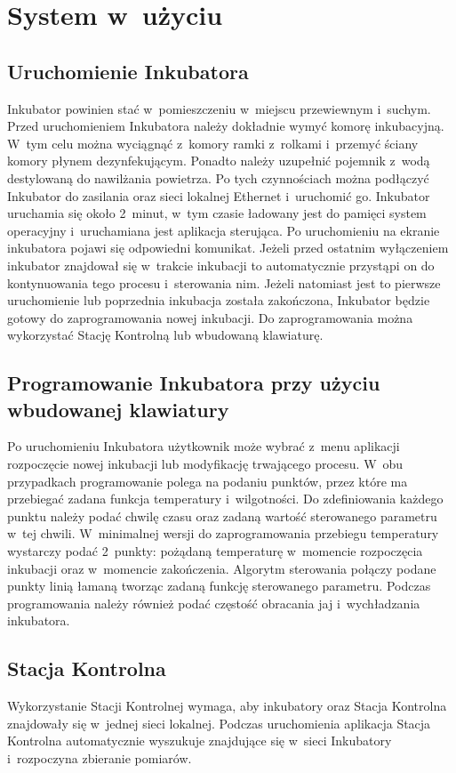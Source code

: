 
\chapter{System w~użyciu}
\label{sec:Praktyka}

\section{Uruchomienie Inkubatora}
Inkubator powinien stać w~pomieszczeniu w~miejscu przewiewnym i~suchym. Przed
uruchomieniem Inkubatora należy dokładnie wymyć komorę inkubacyjną. W~tym celu
można wyciągnąć z~komory ramki z~rolkami i~przemyć ściany komory płynem
dezynfekującym. Ponadto należy uzupełnić pojemnik z~wodą destylowaną do
nawilżania powietrza. Po tych czynnościach można podłączyć Inkubator do
zasilania oraz sieci lokalnej Ethernet i~uruchomić go. Inkubator uruchamia się
około 2~minut, w~tym czasie ładowany jest do pamięci system operacyjny
i~uruchamiana jest aplikacja sterująca. Po uruchomieniu na ekranie
inkubatora pojawi się odpowiedni komunikat. Jeżeli przed ostatnim wyłączeniem
inkubator znajdował się w~trakcie inkubacji to automatycznie przystąpi on do
kontynuowania tego procesu i~sterowania nim. Jeżeli natomiast jest to pierwsze
uruchomienie lub poprzednia inkubacja została zakończona, Inkubator będzie
gotowy do zaprogramowania nowej inkubacji. Do zaprogramowania można wykorzystać
Stację Kontrolną lub wbudowaną klawiaturę.

\section{Programowanie Inkubatora przy użyciu wbudowanej klawiatury}
Po uruchomieniu Inkubatora użytkownik może wybrać z~menu aplikacji rozpoczęcie
nowej inkubacji lub modyfikację trwającego procesu. W~obu przypadkach
programowanie polega na podaniu punktów, przez które ma przebiegać zadana
funkcja temperatury i~wilgotności. Do zdefiniowania każdego punktu należy podać
chwilę czasu oraz zadaną wartość sterowanego parametru w~tej chwili.
W~minimalnej wersji do zaprogramowania przebiegu temperatury wystarczy podać
2~punkty: pożądaną temperaturę w~momencie rozpoczęcia inkubacji oraz w~momencie
zakończenia. Algorytm sterowania połączy podane punkty linią łamaną tworząc zadaną
funkcję sterowanego parametru. Podczas programowania należy również podać
częstość obracania jaj i~wychładzania inkubatora.

\section{Stacja Kontrolna}
Wykorzystanie Stacji Kontrolnej wymaga, aby inkubatory oraz Stacja Kontrolna
znajdowały się w~jednej sieci lokalnej. Podczas uruchomienia aplikacja Stacja
Kontrolna automatycznie wyszukuje znajdujące się w~sieci Inkubatory i~rozpoczyna
zbieranie pomiarów.

